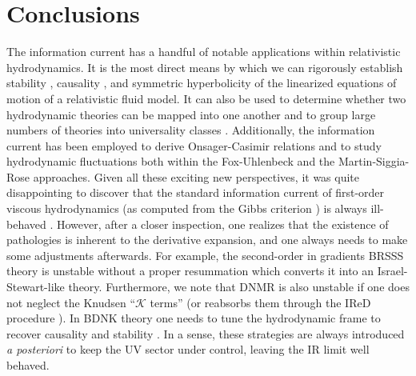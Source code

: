 \documentclass[a4paper, amsfonts, amssymb, amsmath, reprint, showkeys, nofootinbib, twoside,notitlepage,onecolumn,preprintnumbers]{revtex4-2}
\theoremstyle{definition}
\theoremstyle{theorem}
\theoremstyle{corollary}
\begin{document}

\section{Conclusions} \label{conk}

The information current has a handful of notable applications within relativistic hydrodynamics. It is the most direct means by which we can rigorously establish stability \cite{GavassinoGibbs2021}, causality \cite{GavassinoCausality2021}, and symmetric hyperbolicity \cite{GavassinoNonHydro2022,GavassinoUniversality2023} of the linearized equations of motion of a relativistic fluid model. It can also be used to determine whether two hydrodynamic theories can be mapped into one another  \cite{GavassinoGENERIC2022} and to group large numbers of theories into universality classes \cite{GavassinoUniversality2023}. Additionally, the information current has been employed to derive Onsager-Casimir relations \cite{GavassinoSymmetric2022} and to study hydrodynamic fluctuations both within the Fox-Uhlenbeck \cite{doi:10.1063/1.1693183,Mullins:2023tjg} and the Martin-Siggia-Rose \cite{Martin:1973zz,Mullins:2023ott} approaches. Given all these exciting new perspectives, it was quite disappointing to discover that the standard information current of first-order viscous hydrodynamics  (as computed from the Gibbs criterion \cite{GavassinoGibbs2021}) is always ill-behaved \cite{GavassinoLyapunov_2020}. 
However, after a closer inspection, one realizes that the existence of pathologies is inherent to the derivative expansion, and one always needs to make some adjustments afterwards. For example, the second-order in gradients BRSSS theory \cite{Baier:2007ix} is unstable without a proper resummation which converts it into an Israel-Stewart-like theory. Furthermore, we note that DNMR \cite{Denicol2012Boltzmann} is also unstable if one does not neglect the Knudsen ``$\mathcal{K}$ terms'' (or reabsorbs them through the IReD procedure \cite{WagnerIReD2022}). In BDNK theory one needs to tune the hydrodynamic frame to recover causality and stability \cite{Bemfica2017TheFirst}. In a sense, these strategies are always introduced \textit{a posteriori} to keep the UV sector under control, leaving the IR limit well behaved.
\end{document}
